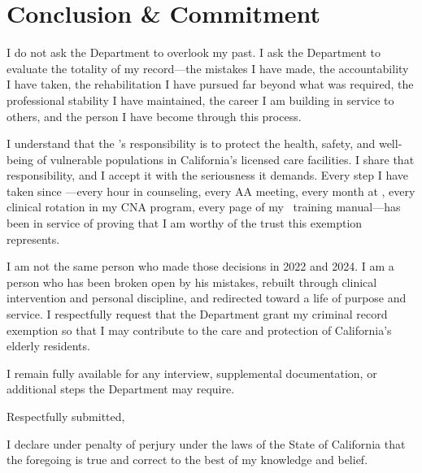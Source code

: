 \section{Conclusion \& Commitment}

I do not ask the Department to overlook my past. I ask the Department to evaluate the totality of my record---the mistakes I have made, the accountability I have taken, the rehabilitation I have pursued far beyond what was required, the professional stability I have maintained, the career I am building in service to others, and the person I have become through this process.

I understand that the \BranchAbbrev's responsibility is to protect the health, safety, and well-being of vulnerable populations in California's licensed care facilities. I share that responsibility, and I accept it with the seriousness it demands. Every step I have taken since \IncidentTwoDate---every hour in counseling, every AA meeting, every month at \RehabProgram, every clinical rotation in my CNA program, every page of my \FacilityTypeShort\ training manual---has been in service of proving that I am worthy of the trust this exemption represents.

I am not the same person who made those decisions in 2022 and 2024. I am a person who has been broken open by his mistakes, rebuilt through clinical intervention and personal discipline, and redirected toward a life of purpose and service. I respectfully request that the Department grant my criminal record exemption so that I may contribute to the care and protection of California's elderly residents.

I remain fully available for any interview, supplemental documentation, or additional steps the Department may require.

\vspace{1em}
\noindent Respectfully submitted,

\signatureline{\ApplicantName}

\begin{swornstatement}
I declare under penalty of perjury under the laws of the State of California that the foregoing is true and correct to the best of my knowledge and belief.
\end{swornstatement}
